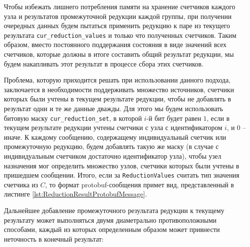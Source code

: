 \documentclass{article}
\theoremstyle{plain}
\theoremstyle{plain}
\theoremstyle{plain}
\theoremstyle{plain}
\theoremstyle{definition}
\theoremstyle{remark}
\theoremstyle{plain}
\begin{document}
Чтобы избежать лишнего потребления памяти на хранение счетчиков каждого узла и результатов промежуточной редукции каждой группы, при получении очередных данных будем пытаться применить редукцию к паре из текущего результата \texttt{cur\_re\-duc\-ti\-on\_values} и только что полученных счетчиков. Таким образом, вместо постоянного поддержания состояния в виде значений всех счетчиков, которые должны в итоге составить общий результат редукции, мы будем накапливать этот результат в процессе сбора этих счетчиков.

Проблема, которую приходится решать при использовании данного подхода, заключается в необходимости поддерживать множество источников, счетчики которых были учтены в текущем результате редукции, чтобы не добавлять в результат одни и те же данные дважды. Для этого мы будем использовать битовую маску \texttt{cur\_re\-duc\-ti\-on\_set}, в которой $i$-й бит будет равен $1$, если в текущем результате редукции учтены счетчики с узла с идентификатором $i$, и $0$ -- иначе. К каждому сообщению, содержащему индивидуальный счетчик или промежуточную редукцию, будем добавлять такую же маску (в случае с индивидуальным счетчиком достаточно идентификатор узла), чтобы узел назначения мог определить множество узлов, счетчики которых были учтены в пришедшем сообщении. Итого, если за \texttt{ReductionValues} считать тип значения счетчика из $C$, то формат protobuf-сообщения примет вид, представленный в листинге \ref{lst:ReductionResultProtobufMessage}.


Дальнейшее добавление промежуточного результата редукции к текущему результату может выполняться двумя диаметрально противоположными способами, каждый из которых определенным образом может привнести неточность в конечный результат:
\end{document}
